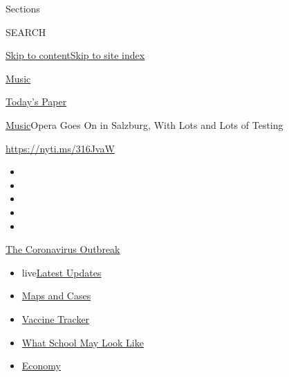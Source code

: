 Sections

SEARCH

\protect\hyperlink{site-content}{Skip to
content}\protect\hyperlink{site-index}{Skip to site index}

\href{https://www.nytimes3xbfgragh.onion/section/arts/music}{Music}

\href{https://myaccount.nytimes3xbfgragh.onion/auth/login?response_type=cookie\&client_id=vi}{}

\href{https://www.nytimes3xbfgragh.onion/section/todayspaper}{Today's
Paper}

\href{/section/arts/music}{Music}\textbar{}Opera Goes On in Salzburg,
With Lots and Lots of Testing

\url{https://nyti.ms/316JvaW}

\begin{itemize}
\item
\item
\item
\item
\item
\end{itemize}

\href{https://www.nytimes3xbfgragh.onion/news-event/coronavirus?action=click\&pgtype=Article\&state=default\&region=TOP_BANNER\&context=storylines_menu}{The
Coronavirus Outbreak}

\begin{itemize}
\tightlist
\item
  live\href{https://www.nytimes3xbfgragh.onion/2020/08/01/world/coronavirus-covid-19.html?action=click\&pgtype=Article\&state=default\&region=TOP_BANNER\&context=storylines_menu}{Latest
  Updates}
\item
  \href{https://www.nytimes3xbfgragh.onion/interactive/2020/us/coronavirus-us-cases.html?action=click\&pgtype=Article\&state=default\&region=TOP_BANNER\&context=storylines_menu}{Maps
  and Cases}
\item
  \href{https://www.nytimes3xbfgragh.onion/interactive/2020/science/coronavirus-vaccine-tracker.html?action=click\&pgtype=Article\&state=default\&region=TOP_BANNER\&context=storylines_menu}{Vaccine
  Tracker}
\item
  \href{https://www.nytimes3xbfgragh.onion/interactive/2020/07/29/us/schools-reopening-coronavirus.html?action=click\&pgtype=Article\&state=default\&region=TOP_BANNER\&context=storylines_menu}{What
  School May Look Like}
\item
  \href{https://www.nytimes3xbfgragh.onion/live/2020/07/31/business/stock-market-today-coronavirus?action=click\&pgtype=Article\&state=default\&region=TOP_BANNER\&context=storylines_menu}{Economy}
\end{itemize}

